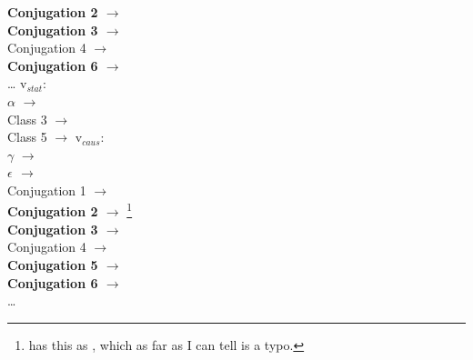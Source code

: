 \begin{exe}
\begin{xlist}
\begin{xlist}
\begin{exe}
\begin{exe}
\begin{xlist}
\begin{exe}
\begin{xlist}
\begin{exe}
\begin{xlist}
\begin{xlist}
\begin{exe}
\begin{xlist}
\begin{exe}
\begin{xlist}
\begin{exe}
\begin{exe}
\begin{exe}
\begin{xlist}
\begin{exe}
\begin{exe}
\begin{xlist}
\begin{xlist}
\begin{exe}
\begin{xlist}
\begin{exe}
\begin{exe}
\begin{exe}
\begin{xlist}
\begin{exe}
\begin{exe}
\begin{xlist}
\begin{exe}
\begin{xlist}
\begin{exe}
\begin{xlist}
\begin{exe}
\begin{xlist}
\begin{exe}
\begin{exe}
\begin{xlist}
\begin{exe}
\begin{exe}
\begin{xlist}
\begin{xlist}
\begin{exe}
\begin{xlist}
\begin{xlist}
\begin{exe}
\begin{xlist}
\begin{exe}
\begin{xlist}
\begin{exe}
\begin{xlist}
\begin{exe}
\begin{xlist}
\begin{exe}
\begin{exe}
\begin{exe}
\begin{exe}
\begin{xlist}
\begin{exe}
\begin{exe}
\begin{xlist}
\begin{xlist}
\begin{exe}
\begin{exe}
\begin{xlist}
\begin{exe}
\begin{xlist}
\begin{multicols}{2}
			\textbf{Conjugation 2 $\rightarrow$ {\tkal}}\\
			\textbf{Conjugation 3 $\rightarrow$ {\tnif}}\\
			Conjugation 4 $\rightarrow$ {\thit}\\
			\textbf{Conjugation 6 $\rightarrow$ {\thif}}\\
			\dots
		\columnbreak
 	\ex  v$_{stat}$: \\
			$ \alpha$ $\rightarrow$ {\tkal} \\
			Class 3 $\rightarrow$ {\tkal}\\
			Class 5 $\rightarrow$ {\tkal}
 	\ex  v$_{caus}$: \\
			$\gamma$ $\rightarrow$ {\tpie}\\
			\textbf{$\epsilon$ $\rightarrow$ {\thif}}\\
			Conjugation 1 $\rightarrow$ {\tkal}\\
			\textbf{Conjugation 2 $\rightarrow$ {\thif}}\footnote{\citet[231]{arad05} has this as {\tnif}, which as far as I can tell is a typo.}\\
			\textbf{Conjugation 3 $\rightarrow$ {\thif}}\\
			Conjugation 4 $\rightarrow$ {\tpie}\\
			\textbf{Conjugation 5 $\rightarrow$ {\thif}}\\
			\textbf{Conjugation 6 $\rightarrow$ {\thif}}\\
			\dots
	\end{multicols}
 \z
\z 


\end{xlist}
\end{exe}
\end{xlist}
\end{exe}
\end{exe}
\end{xlist}
\end{xlist}
\end{exe}
\end{exe}
\end{xlist}
\end{exe}
\end{exe}
\end{exe}
\end{exe}
\end{xlist}
\end{exe}
\end{xlist}
\end{exe}
\end{xlist}
\end{exe}
\end{xlist}
\end{exe}
\end{xlist}
\end{xlist}
\end{exe}
\end{xlist}
\end{xlist}
\end{exe}
\end{exe}
\end{xlist}
\end{exe}
\end{exe}
\end{xlist}
\end{exe}
\end{xlist}
\end{exe}
\end{xlist}
\end{exe}
\end{xlist}
\end{exe}
\end{exe}
\end{xlist}
\end{exe}
\end{exe}
\end{exe}
\end{xlist}
\end{exe}
\end{xlist}
\end{xlist}
\end{exe}
\end{exe}
\end{xlist}
\end{exe}
\end{exe}
\end{exe}
\end{xlist}
\end{exe}
\end{xlist}
\end{exe}
\end{xlist}
\end{xlist}
\end{exe}
\end{xlist}
\end{exe}
\end{xlist}
\end{exe}
\end{exe}
\end{xlist}
\end{xlist}
\end{exe}
